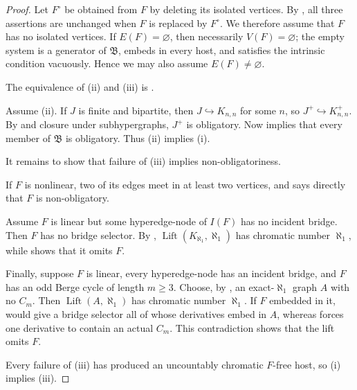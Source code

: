 \documentclass[11pt]{amsart}
\theoremstyle{definition}
\theoremstyle{remark}
\numberwithin{equation}{section}
\newcommand{\Bclass}{\mathfrak B}
\newcommand{\Lift}{\operatorname{Lift}}
\begin{document}
\begin{proof}
Let $F^\circ$ be obtained from $F$ by deleting its isolated vertices.
By , all three assertions are unchanged when
$F$ is replaced by $F^\circ$.  We therefore assume that $F$ has no
isolated vertices.  If $E(F)=\varnothing$, then necessarily
$V(F)=\varnothing$; the empty system is a generator of $\Bclass$, embeds
in every host, and satisfies the intrinsic condition vacuously.  Hence
we may also assume $E(F)\ne\varnothing$.

The equivalence of \textup{(ii)} and \textup{(iii)} is
.

Assume \textup{(ii)}.  If $J$ is finite and bipartite, then
$J\hookrightarrow K_{n,n}$ for some $n$, so
$J^+\hookrightarrow K_{n,n}^+$.  By  and closure under
subhypergraphs, $J^+$ is obligatory.  Now
 implies that every member of $\Bclass$ is
obligatory.  Thus \textup{(ii)} implies \textup{(i)}.

It remains to show that failure of \textup{(iii)} implies
non-obligatoriness.

If $F$ is nonlinear, two of its edges meet in at least two vertices, and
 says directly that $F$ is non-obligatory.

Assume $F$ is linear but some hyperedge-node of $I(F)$ has no incident
bridge.  Then $F$ has no bridge selector.  By
, $\Lift(K_{\aleph_1},\aleph_1)$ has chromatic
number $\aleph_1$, while  shows that it omits $F$.

Finally, suppose $F$ is linear, every hyperedge-node has an incident
bridge, and $F$ has an odd Berge cycle of length $m\ge3$.  Choose, by
, an exact-$\aleph_1$ graph $A$ with no $C_m$.
Then $\Lift(A,\aleph_1)$ has chromatic number $\aleph_1$.  If $F$
embedded in it,  would give a bridge selector all
of whose derivatives embed in $A$, whereas 
forces one derivative to contain an actual $C_m$.  This contradiction
shows that the lift omits $F$.

Every failure of \textup{(iii)} has produced an uncountably chromatic
$F$-free host, so \textup{(i)} implies \textup{(iii)}.
\end{proof}
\end{document}
